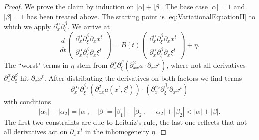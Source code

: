 \documentclass{amsart}
\theoremstyle{definition}
\begin{document}
\begin{proof}
We prove the claim by induction on $|\alpha| + |\beta|$.
The base case $|\alpha| = 1$ and $|\beta| = 1$ has been treated above. The starting point is \eqref{eq:VariationalEquationII} to which we apply $\partial_x^{\alpha} \partial_{\xi}^{\beta}$. We arrive at
\begin{equation*}
\frac{d}{dt} \begin{pmatrix}
\partial_x^{\alpha} \partial_{\xi}^{\beta} \partial_x x^t \\ \partial_x^{\alpha} \partial_{\xi}^{\beta} \partial_x \xi^t
\end{pmatrix}
= B(t) \begin{pmatrix}
\partial_x^{\alpha} \partial_{\xi}^{\beta} \partial_x x^t \\ \partial_x^{\alpha} \partial_{\xi}^{\beta} \partial_x \xi^t
\end{pmatrix}
+ \eta.
\end{equation*}
The ``worst" terms in $\eta$ stem from $\partial_x^{\alpha} \partial_{\xi}^{\beta} ( \partial^2_{xx} a \cdot \partial_x x^t)$, where not all derivatives $\partial_x^{\alpha} \partial_{\xi}^{\beta}$ hit $\partial_x x^t$. After distributing the derivatives on both factors we find terms
\begin{equation*}
\partial_x^{\alpha_1} \partial_{\xi}^{\beta_1} (\partial^2_{xx} a(x^t,\xi^t)) \cdot (\partial_x^{\alpha_2} \partial_{\xi}^{\beta_2} \partial_x x^t)
\end{equation*}
with conditions
\begin{equation*}
|\alpha_1| + |\alpha_2| = |\alpha|, \quad |\beta| = |\beta_1| + |\beta_2|, \quad |\alpha_2| + |\beta_2| < |\alpha| + |\beta|.
\end{equation*}
The first two constraints are due to Leibniz's rule, the last one reflects that not all derivatives act on $\partial_x x^t$ in the inhomogeneity $\eta$.


\end{proof}
\end{document}
